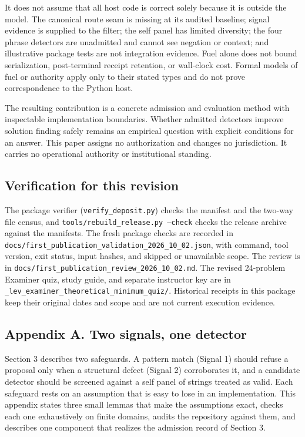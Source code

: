 \documentclass[
  11pt,
]{article}
\begin{document}
It does not assume that all host code is correct solely because it is
outside the model. The canonical route seam is missing at its audited
baseline; signal evidence is supplied to the filter; the self panel has
limited diversity; the four phrase detectors are unadmitted and cannot
see negation or context; and illustrative package tests are not
integration evidence. Fuel alone does not bound serialization,
post-terminal receipt retention, or wall-clock cost. Formal models of
fuel or authority apply only to their stated types and do not prove
correspondence to the Python host.

The resulting contribution is a concrete admission and evaluation method
with inspectable implementation boundaries. Whether admitted detectors
improve solution finding safely remains an empirical question with
explicit conditions for an answer. This paper assigns no authorization
and changes no jurisdiction. It carries no operational authority or
institutional standing.

\hypertarget{verification-for-this-revision}{%
\subsection{Verification for this
revision}\label{verification-for-this-revision}}

The package verifier (\texttt{\nolinkurl{verify_deposit.py}})
checks the manifest and the two-way file census, and
\texttt{tools/rebuild\_release.py --check} checks the
release archive against the manifests. The fresh package checks are
recorded in
\texttt{\nolinkurl{docs/first_publication_validation_2026_10_02.json}},
with command, tool version, exit status, input hashes, and skipped or
unavailable scope. The review is in
\texttt{\nolinkurl{docs/first_publication_review_2026_10_02.md}}.
The revised 24-problem Examiner quiz, study guide, and separate instructor
key are in
\texttt{\nolinkurl{_lev_examiner_theoretical_minimum_quiz/}}.
Historical receipts in this package keep their original dates and scope
and are not current execution evidence.

\hypertarget{appendix-a.-two-signals-one-detector}{%
\subsection{Appendix A. Two signals, one
detector}\label{appendix-a.-two-signals-one-detector}}

Section 3 describes two safeguards. A pattern match (Signal 1) should
refuse a proposal only when a structural defect (Signal 2) corroborates
it, and a candidate detector should be screened against a self panel of
strings treated as valid. Each safeguard rests on an assumption that is
easy to lose in an implementation. This appendix states three small
lemmas that make the assumptions exact, checks each one exhaustively on
finite domains, audits the repository against them, and describes one
component that realizes the admission record of Section 3.
\end{document}
